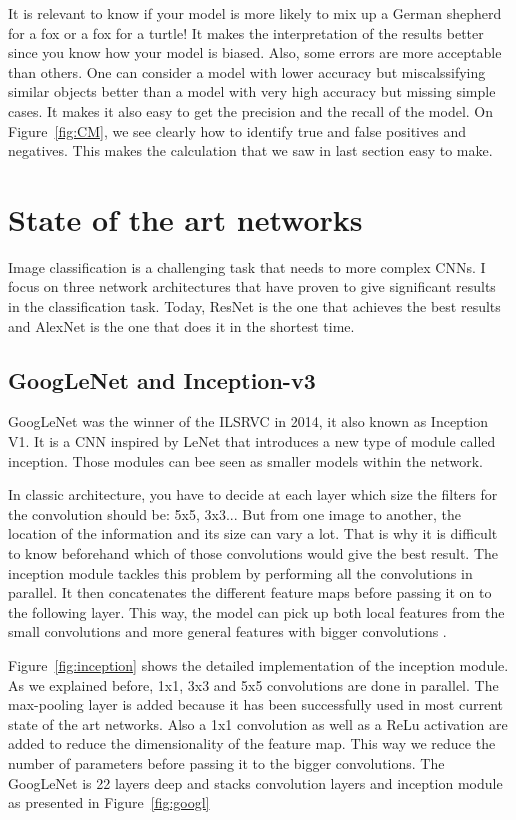 It is relevant to know if your model is more likely to mix up  a German shepherd for a fox or a fox for a turtle! It makes the interpretation of the results better since you know how your model is biased. Also, some errors are more acceptable than others. One can consider a model with lower accuracy but miscalssifying similar objects better than a model with very high accuracy but missing simple cases. 
It makes it also easy to get the precision and the recall of the model. On Figure~\ref{fig:CM}, we see clearly how to identify true and false positives and negatives. This makes the calculation that we saw in last section easy to make. 



\section{State of the art networks}
Image classification is a challenging task that needs to more complex CNNs. I focus on three network architectures that have proven to give significant results in the classification task. Today, ResNet is the one that achieves the best results and AlexNet is the one that does it in the shortest time.    

\subsection{GoogLeNet and Inception-v3}
GoogLeNet was the winner of the ILSRVC in 2014, it also known as Inception V1. It is a CNN inspired by LeNet that introduces a new type of module called inception. Those modules can bee seen as smaller models within the network. 

In classic architecture, you have to decide at each layer which size the filters for the convolution should be: 5x5, 3x3... But from one image to another, the location of the information and its size can vary a lot. That is why it is difficult to know beforehand which of those convolutions would give the best result. The inception module tackles this problem by performing all the convolutions in parallel. It then concatenates the different feature maps before passing it on to the following layer. This way, the model can pick up both local features from the small convolutions and more general features with bigger convolutions \cite{googlepaper}. 

Figure~\ref{fig:inception} shows the detailed implementation of the inception module. As we explained before, 1x1, 3x3 and 5x5 convolutions are done in parallel. The max-pooling layer is added because it has been successfully used in most current state of the art networks. Also a 1x1 convolution as well as a ReLu activation are added to reduce the dimensionality of the feature map. This way we reduce the number of parameters before passing it to the bigger convolutions. The GoogLeNet is 22 layers deep and stacks convolution layers and inception module as presented in Figure~\ref{fig:googl}


